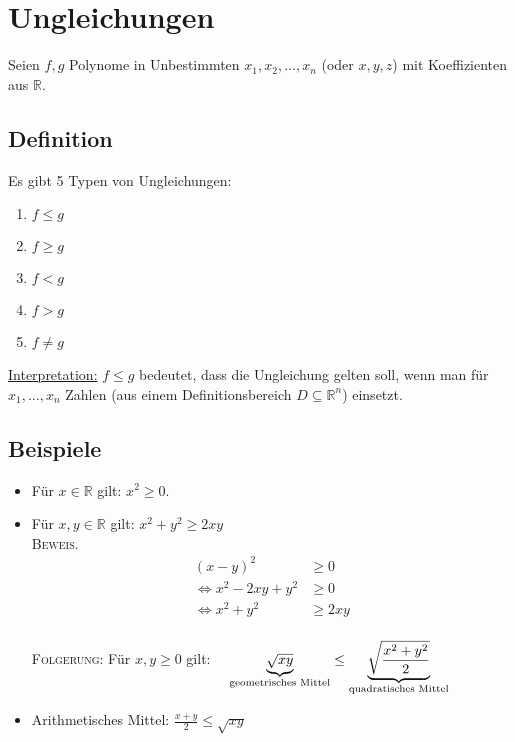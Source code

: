 \section{Ungleichungen}

Seien $f,g$ Polynome in Unbestimmten $x_1,x_2,\dots,x_n$ (oder $x,y,z$) mit Koeffizienten aus $\mathbb{R}$.

\subsection{Definition}

	Es gibt 5 Typen von Ungleichungen:
	
	\begin{enumerate}
	\item $f\leq g$
	\item $f\geq g$
	\item $f<g$
	\item $f>g$
	\item $f\neq g$
	\end{enumerate}
	
	\underline{Interpretation:} $f\leq g$ bedeutet, dass die Ungleichung gelten soll, wenn man für $x_1,\dots,x_n$
	Zahlen (aus einem Definitionsbereich $D\subseteq \mathbb{R}^n$) einsetzt.
	
	
\subsection{Beispiele}

	\begin{itemize}
	\item Für $x\in \mathbb{R}$ gilt: $x^2\geq 0$.
	\item Für $x,y \in \mathbb{R}$ gilt: $x^2+y^2\geq 2xy$\\ \newline
	\textsc{Beweis.}\begin{align*}
					(x-y)^2 &\geq 0 \\
					\Leftrightarrow x^2 -2xy +y^2 &\geq 0 \\
					\Leftrightarrow x^2+y^2 &\geq 2xy
					\end{align*}\\
	\textsc{Folgerung:} Für $x,y\geq 0$ gilt: $\quad  \underbrace{\sqrt{xy}}_{\textnormal{geometrisches Mittel}}
						\leq \underbrace{\sqrt{\frac{x^2+y^2}{2}}}_{\textnormal{quadratisches Mittel}}$
						
	\item Arithmetisches Mittel:  $\frac{x+y}{2}\leq \sqrt{xy}$		
	
	\end{itemize}


